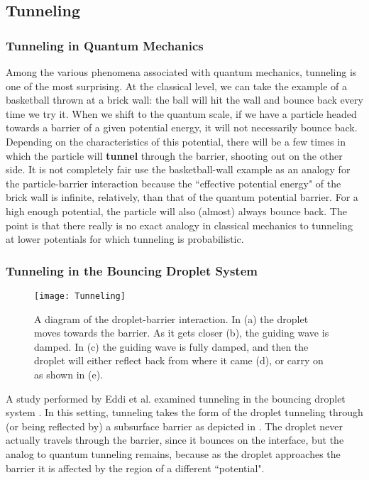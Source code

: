 

\subsection{Tunneling}

    \subsubsection{Tunneling in Quantum Mechanics}
    
Among the various phenomena associated with quantum mechanics, tunneling is one of the most surprising. At the classical level, we can take the example of a basketball thrown at a brick wall: the ball will hit the wall and bounce back every time we try it. When we shift to the quantum scale, if we have a particle headed towards a barrier of a given potential energy, it will not necessarily bounce back. Depending on the characteristics of this potential, there will be a few times in which the particle will \textbf{tunnel} through the barrier, shooting out on the other side. It is not completely fair use the basketball-wall example as an analogy for the particle-barrier interaction because the ``effective potential energy" of the brick wall is infinite, relatively, than that of the quantum potential barrier. For a high enough potential, the particle will also (almost) always bounce back. The point is that there really is no exact analogy in classical mechanics to tunneling at lower potentials for which tunneling is probabilistic. 

    \subsubsection{Tunneling in the Bouncing Droplet System}

\begin{figure}[h!]
 \centering
	    \texttt{[image: Tunneling]}
	     \caption{A diagram of the droplet-barrier interaction. In (a) the droplet moves towards the barrier. As it gets closer (b), the guiding wave is damped. In (c) the guiding wave is fully damped, and then the droplet will either reflect back from where it came (d), or carry on as shown in (e).}
	 \label{tuncartoon}
	\end{figure}
	A study performed by Eddi et al. examined tunneling in the bouncing droplet system \cite{tunneling}. In this setting, tunneling takes the form of the droplet tunneling through (or being reflected by) a subsurface barrier as depicted in . The droplet never actually travels through the barrier, since it bounces on the interface, but the analog to quantum tunneling remains, because as the droplet approaches the barrier it is affected by the region of a different ``potential". 
	
